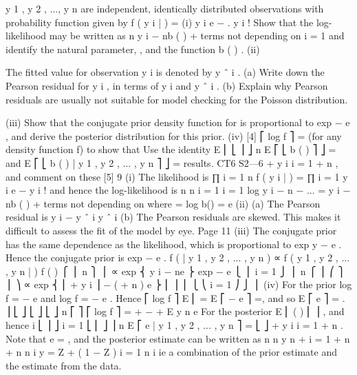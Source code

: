 y 1 , y 2 , ..., y n are independent, identically distributed observations with probability
function given by f ( y i | \mu ) =
(i)
\mu y i e −\mu
.
y i !
Show that the log-likelihood may be written as
n
\theta \sum  y i − nb ( \theta ) + terms not depending on \theta
i = 1
and identify the natural parameter, \theta , and the function b ( \theta ) .
(ii)

The fitted value for observation y i is denoted by y ˆ i .
(a) Write down the Pearson residual for y i , in terms of y i and y ˆ i .
(b) Explain why Pearson residuals are usually not suitable for model
checking for the Poisson distribution.

(iii)
Show that the conjugate prior density function for \theta is proportional to
{
}
exp \alpha\theta − \beta e \theta , and derive the posterior distribution for this prior.
(iv)
[4]
⎡ \partial  log f ⎤
= \theta  (for any density function f) to show that
Use the identity E ⎢
⎣ \partial \theta ⎥ ⎦
n
\alpha
E ⎡ ⎣ b ( \theta ) ⎤ ⎦ = and E ⎡ ⎣ b ( \theta ) | y 1 , y 2 , ... , y n ⎤ ⎦ =
\beta
results.
CT6 S2\theta {}—6
\alpha + \sum  y i
i = 1
\beta+ n
, and comment on these
[5]
9
(i)
The likelihood is
∏
i = 1
n
f ( y i | \mu ) = ∏
i = 1
\mu y i e −\mu
y i !
and hence the log-likelihood is
n n
i = 1 i = 1
log \mu \sum  y i − n \mu − ... = \theta \sum  y i − nb ( \theta ) + terms not depending on \theta
where \theta = log\mu
b(\theta) = e \theta
(ii)
(a)
The Pearson residual is
y i − y ˆ i
y ˆ i
(b)
The Pearson residuals are skewed.
This makes it difficult to assess the fit of the model by eye.
Page 11%
(iii)
The conjugate prior has the same \theta dependence as the likelihood, which is
{
}
{
}
proportional to exp y \theta − e \theta . Hence the conjugate prior is exp \alpha\theta − \beta e \theta .
f ( \theta | y 1 , y 2 , ... , y n ) ∝ f ( y 1 , y 2 , ... , y n | \theta ) f ( \theta )
⎧ ⎪ n
⎫ ⎪
∝ exp ⎨ \theta \sum  y i − ne \theta ⎬ exp \alpha\theta − \beta e \theta
⎩ ⎪ i = 1
⎭ ⎪
n
⎧ ⎪ ⎛
⎫ ⎪
⎞
∝ exp ⎨ \theta ⎜ \alpha + \sum  y i ⎟ − ( \beta + n ) e \theta ⎬
⎜
⎟
⎪ ⎩ ⎝
i = 1
⎠
⎭ ⎪
{
(iv)
For the prior log f = \alpha\theta − \beta e \theta and
}
\partial  log f
= \alpha − \beta e \theta . Hence
\partial  \theta
\alpha
⎡ \partial  log f ⎤
E ⎢
= E ⎡ \alpha − \beta e \theta ⎤ =\theta , and so E ⎡ e \theta ⎤ = .
⎥
⎣ ⎦ \beta
⎣
⎦
⎣ \partial \theta ⎦
n
⎡
⎤
⎡ \partial  log f ⎤
\theta
=
\alpha
+
−
\beta
+
E
y
n
e
For the posterior E ⎢
(
)
⎢
⎥ , and hence
\sum  i
⎣ \partial \theta ⎥ ⎦
i = 1
⎣ ⎢
⎦ ⎥
n
\theta
E ⎡ e | y 1 , y 2 , ... , y n ⎤ =
⎣
⎦
\alpha + \sum  y i
i = 1
\beta+ n
.
Note that e \theta = \mu , and the posterior estimate can be written as
n
n
\beta
\sum  y
\alpha
n
\times  +
\times  i = 1
\beta + n \beta \beta + n
n
i
\sum  y
\alpha
= Z + ( 1 − Z ) i = 1
\beta
n
i
ie a combination of the prior estimate and the estimate from the data.
